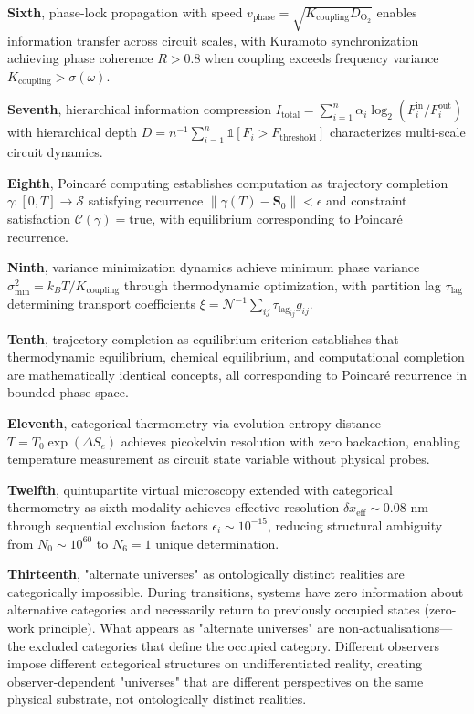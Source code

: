 \documentclass[12pt,a4paper]{article}
\theoremstyle{plain}
\theoremstyle{definition}
\theoremstyle{remark}
\newcommand{\Sspace}{\mathcal{S}}
\newcommand{\Se}{S_e}
\newcommand{\Scoord}{\mathbf{S}}
\newcommand{\taulag}{\tau_{\mathrm{lag}}}
\begin{document}
\textbf{Sixth}, phase-lock propagation with speed $v_{\text{phase}} = \sqrt{K_{\text{coupling}} D_{\text{O}_2}}$ enables information transfer across circuit scales, with Kuramoto synchronization achieving phase coherence $R > 0.8$ when coupling exceeds frequency variance $K_{\text{coupling}} > \sigma(\omega)$.

\textbf{Seventh}, hierarchical information compression $I_{\text{total}} = \sum_{i=1}^n \alpha_i \log_2(F_i^{\text{in}}/F_i^{\text{out}})$ with hierarchical depth $D = n^{-1} \sum_{i=1}^n \mathbb{1}[F_i > F_{\text{threshold}}]$ characterizes multi-scale circuit dynamics.

\textbf{Eighth}, Poincaré computing establishes computation as trajectory completion $\gamma: [0,T] \to \Sspace$ satisfying recurrence $\|\gamma(T) - \Scoord_0\| < \epsilon$ and constraint satisfaction $\mathcal{C}(\gamma) = \text{true}$, with equilibrium corresponding to Poincaré recurrence.

\textbf{Ninth}, variance minimization dynamics achieve minimum phase variance $\sigma^2_{\min} = k_B T / K_{\text{coupling}}$ through thermodynamic optimization, with partition lag $\taulag$ determining transport coefficients $\xi = \mathcal{N}^{-1} \sum_{ij} \taulag_{ij} g_{ij}$.

\textbf{Tenth}, trajectory completion as equilibrium criterion establishes that thermodynamic equilibrium, chemical equilibrium, and computational completion are mathematically identical concepts, all corresponding to Poincaré recurrence in bounded phase space.

\textbf{Eleventh}, categorical thermometry via evolution entropy distance $T = T_0 \exp(\Delta \Se)$ achieves picokelvin resolution with zero backaction, enabling temperature measurement as circuit state variable without physical probes.

\textbf{Twelfth}, quintupartite virtual microscopy extended with categorical thermometry as sixth modality achieves effective resolution $\delta x_{\text{eff}} \sim 0.08$ nm through sequential exclusion factors $\epsilon_i \sim 10^{-15}$, reducing structural ambiguity from $N_0 \sim 10^{60}$ to $N_6 = 1$ unique determination.

\textbf{Thirteenth}, "alternate universes" as ontologically distinct realities are categorically impossible. During transitions, systems have zero information about alternative categories and necessarily return to previously occupied states (zero-work principle). What appears as "alternate universes" are non-actualisations—the excluded categories that define the occupied category. Different observers impose different categorical structures on undifferentiated reality, creating observer-dependent "universes" that are different perspectives on the same physical substrate, not ontologically distinct realities.
\end{document}
